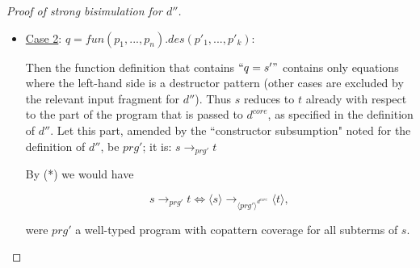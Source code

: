 \documentclass[11pt]{article} %
\begin{document}
\begin{proof}[Proof of strong bisimulation for $d''$]
\begin{enumerate}
\begin{itemize}
By inversion, we have from $s =^? q \searrow \sigma$ that $s$ has the form $fun(v_1, ..., v_n)$ for some values $v_1, ..., v_n$, thus $\langle s \rangle = fun(\langle v_1 \rangle, ..., \langle v_n \rangle)$. By inversion for values, we have that each $v_i$ is either a constructor application or a value of codata type. If it is a value of codata type, by inversion on pattern matching, the relevant subpattern of $q$ can only be a variable, thus it is also matched by $\langle v_i \rangle$. If it is a constructor application, the relevant subpattern of $q$ is either a variable, and the same holds, or it is a constructor pattern, and by recursively descending into its subpatterns we still get that $\langle v_i \rangle = con(\langle v^1_i \rangle, ..., \langle v^m_n \rangle)$ matches against the subpattern of $q$.

By carrying the substitutions returned from the matchings along in the above recursive argument, we get a substitution $\sigma'$ such that $\langle s \rangle =^? q \searrow \sigma'$ and, by distributing over $\langle s' \rangle$, $\langle s' \rangle [\sigma'] = \langle s'[\sigma] \rangle = \langle t \rangle$. It follows that $\langle s \rangle \longrightarrow_{\langle prg \rangle} \langle t \rangle$.

\item \underline{Case 2}: $q = fun(p_1, ..., p_n).des(p'_1, ..., p'_k)$:

Then the function definition that contains $`` q = s' "$ contains only equations where the left-hand side is a destructor pattern (other cases are excluded by the relevant input fragment for $d''$). Thus $s$ reduces to $t$ already with respect to the part of the program that is passed to $d^{core}$, as specified in the definition of $d''$. Let this part, amended by the ``constructor subsumption" noted for the definition of $d''$, be $prg'$; it is: $s \longrightarrow_{prg'} t$

By (*) we would have

\begin{equation*}
s \longrightarrow_{prg'} t \iff \langle s \rangle \longrightarrow_{\langle prg' \rangle^{d^{core}}} \langle t \rangle,
\end{equation*}

were $prg'$ a well-typed program with copattern coverage for all subterms of $s$. 


\end{itemize}
\end{enumerate}
\end{proof}
\end{document}
